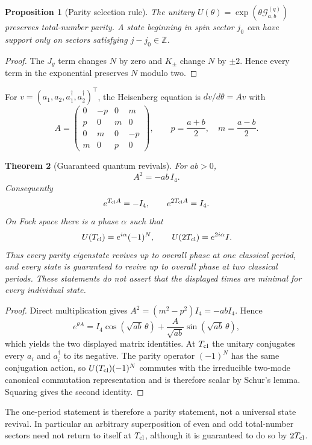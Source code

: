 \documentclass[11pt]{amsart}
\newtheorem{theorem}{Theorem}[section]
\newtheorem{proposition}[theorem]{Proposition}
\theoremstyle{remark}
\begin{document}
\begin{proposition}[Parity selection rule]\label{prop:parity}
The unitary $U(\theta)=\exp(\theta\mathcal G^{(q)}_{a,b})$ preserves total-number parity.  A state beginning in spin sector $j_0$ can have support only on sectors satisfying $j-j_0\in\mathbb Z$.
\end{proposition}
\begin{proof}
The $J_y$ term changes $N$ by zero and $K_\pm$ change $N$ by $\pm2$.  Hence every term in the exponential preserves $N$ modulo two.
\end{proof}

For $v=(a_1,a_2,a_1^\dagger,a_2^\dagger)^\top$, the Heisenberg equation is $dv/d\theta=Av$ with
\[
A=\begin{pmatrix}
0&-p&0&m\\
p&0&m&0\\
0&m&0&-p\\
m&0&p&0
\end{pmatrix},\qquad p=\frac{a+b}{2},\quad m=\frac{a-b}{2}.
\]

\begin{theorem}[Guaranteed quantum revivals]\label{thm:revival}
For $ab>0$,
\[
\boxed{A^2=-ab\,I_4.}
\]
Consequently
\[
e^{T_{\rm cl}A}=-I_4,\qquad e^{2T_{\rm cl}A}=I_4.
\]
On Fock space there is a phase $\alpha$ such that
\[
U(T_{\rm cl})=e^{i\alpha}(-1)^N,
\qquad
U(2T_{\rm cl})=e^{2i\alpha}I.
\]
Thus every parity eigenstate revives up to overall phase at one classical period, and every state is guaranteed to revive up to overall phase at two classical periods.  These statements do not assert that the displayed times are minimal for every individual state.
\end{theorem}
\begin{proof}
Direct multiplication gives $A^2=(m^2-p^2)I_4=-abI_4$.  Hence
\[
e^{\theta A}=I_4\cos(\sqrt{ab}\,\theta)+\frac{A}{\sqrt{ab}}\sin(\sqrt{ab}\,\theta),
\]
which yields the two displayed matrix identities.  At $T_{\rm cl}$ the unitary conjugates every $a_i$ and $a_i^\dagger$ to its negative.  The parity operator $(-1)^N$ has the same conjugation action, so $U(T_{\rm cl})(-1)^N$ commutes with the irreducible two-mode canonical commutation representation and is therefore scalar by Schur's lemma.  Squaring gives the second identity.
\end{proof}

The one-period statement is therefore a parity statement, not a universal state revival.  In particular an arbitrary superposition of even and odd total-number sectors need not return to itself at $T_{\rm cl}$, although it is guaranteed to do so by $2T_{\rm cl}$.
\end{document}
